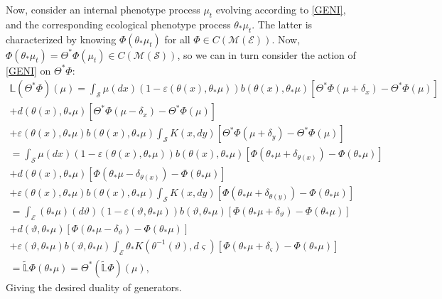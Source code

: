 \documentclass[11pt]{amsart}
\theoremstyle{remark}
\theoremstyle{definition}
\begin{document}
Now, consider an internal phenotype process $\mu_{t}$ evolving according to \eqref{GENI}, and the corresponding ecological phenotype process $\theta_{*}\mu_{t}$.  The latter is characterized by knowing $\Phi(\theta_{*}\mu_{t})$ for all $\Phi \in C(\mathcal{M}(\mathcal{E}))$.  Now, $\Phi(\theta_{*}\mu_{t}) = \Theta^{*}\Phi(\mu_{t}) \in C(\mathcal{M}(\mathcal{S}))$, so we can in turn consider the action of \eqref{GENI} on $\Theta^{*}\Phi$:
\begin{multline*}
	\mathbb{L}(\Theta^{*}\Phi)(\mu) 
	= \int_{\mathcal{S}} \mu(dx) (1-\varepsilon(\theta(x),\theta_{*}\mu)) b(\theta(x),\theta_{*}\mu)
		[\Theta^{*}\Phi(\mu+\delta_{x})-\Theta^{*}\Phi(\mu)]\\
	+ d(\theta(x),\theta_{*}\mu)[\Theta^{*}\Phi(\mu-\delta_{x})-\Theta^{*}\Phi(\mu)]\\
	+ \varepsilon(\theta(x),\theta_{*}\mu) b(\theta(x),\theta_{*}\mu)
		\int_{\mathcal{S}} K(x,dy)[\Theta^{*}\Phi(\mu+\delta_{y})-\Theta^{*}\Phi(\mu)]\\
	= \int_{\mathcal{S}} \mu(dx) (1-\varepsilon(\theta(x),\theta_{*}\mu)) b(\theta(x),\theta_{*}\mu)
		[\Phi(\theta_{*}\mu+\delta_{\theta(x)})-\Phi(\theta_{*}\mu)]\\
	+ d(\theta(x),\theta_{*}\mu)[\Phi(\theta_{*}\mu-\delta_{\theta(x)})-\Phi(\theta_{*}\mu)]\\
	+ \varepsilon(\theta(x),\theta_{*}\mu) b(\theta(x),\theta_{*}\mu)
		\int_{\mathcal{S}} K(x,dy)[\Phi(\theta_{*}\mu+\delta_{\theta(y)})-\Phi(\theta_{*}\mu)]\\
	= \int_{\mathcal{E}} (\theta_{*}\mu)(d\vartheta) (1-\varepsilon(\vartheta,\theta_{*}\mu)) b(\vartheta,\theta_{*}\mu)
		[\Phi(\theta_{*}\mu+\delta_{\vartheta})-\Phi(\theta_{*}\mu)]\\
	+ d(\vartheta,\theta_{*}\mu)[\Phi(\theta_{*}\mu-\delta_{\vartheta})-\Phi(\theta_{*}\mu)]\\
	+ \varepsilon(\vartheta,\theta_{*}\mu) b(\vartheta,\theta_{*}\mu)
		\int_{\mathcal{E}} \theta_{*}K(\theta^{-1}(\vartheta),d\varsigma)[\Phi(\theta_{*}\mu+\delta_{\varsigma})-\Phi(\theta_{*}\mu)]\\
	= \tilde{\mathbb{L}}\Phi(\theta_{*}\mu)
	= \Theta^{*}(\tilde{\mathbb{L}}\Phi)(\mu),
\end{multline*}
Giving the desired duality of generators.
\end{document}
